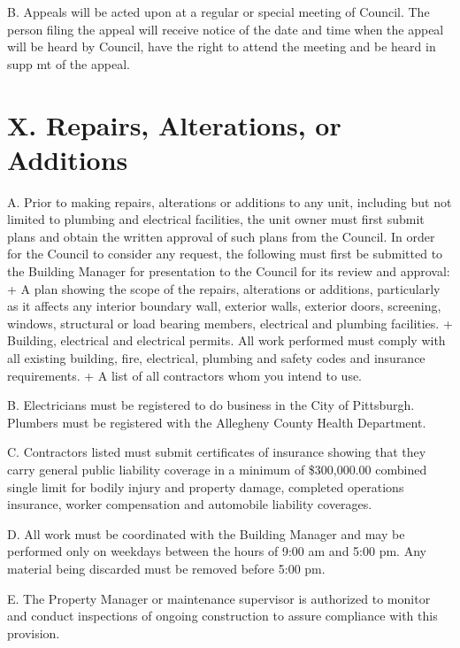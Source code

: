 \documentclass[
]{book}
\begin{document}
B. Appeals will be acted upon at a regular or special meeting of Council. The person filing the appeal will receive notice of the date and time when the appeal will be heard by Council, have the right to attend the meeting and be heard in supp mt of the appeal.

\hypertarget{x.-repairs-alterations-or-additions}{%
\section*{X. Repairs, Alterations, or Additions}\label{x.-repairs-alterations-or-additions}}

A. Prior to making repairs, alterations or additions to any unit, including but not limited to plumbing and electrical facilities, the unit owner must first submit plans and obtain the written approval of such plans from the Council. In order for the Council to consider any request, the following must first be submitted to the Building Manager for presentation to the Council for its review and approval:
+ A plan showing the scope of the repairs, alterations or additions, particularly as it affects any interior boundary wall, exterior walls, exterior doors, screening, windows, structural or load bearing members, electrical and plumbing facilities.
+ Building, electrical and electrical permits. All work performed must comply with all existing building, fire, electrical, plumbing and safety codes and insurance requirements.
+ A list of all contractors whom you intend to use.

B. Electricians must be registered to do business in the City of Pittsburgh. Plumbers must be registered with the Allegheny County Health Department.

C. Contractors listed must submit certificates of insurance showing that they carry general public liability coverage in a minimum of \$300,000.00 combined single limit for bodily injury and property damage, completed operations insurance, worker compensation and automobile liability coverages.

D. All work must be coordinated with the Building Manager and may be performed only on weekdays between the hours of 9:00 am and 5:00 pm. Any material being discarded must be removed before 5:00 pm.

E. The Property Manager or maintenance supervisor is authorized to monitor and conduct inspections of ongoing construction to assure compliance with this provision.
\end{document}
